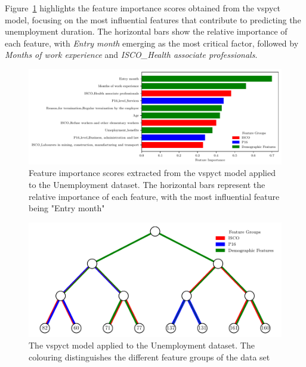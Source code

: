 \documentclass[3p,review,authoryear]{elsarticle}
\begin{document}
Figure~\ref{fig:feature_importance} highlights the feature importance scores obtained from the \gls{vspyct} model, focusing on the most influential features that contribute to predicting the unemployment duration.
The horizontal bars show the relative importance of each feature, with \textit{Entry month} emerging as the most critical factor, followed by \textit{Months of work experience} and \textit{ISCO\_Health associate professionals}.

\begin{figure}[h!]
    \centering
    \includegraphics[width=1.0\textwidth]{feature_importance_colored.pdf}
    \caption{Feature importance scores extracted from the \gls{vspyct} model applied to the Unemployment dataset. The horizontal bars represent the relative importance of each feature, with the most influential feature being "Entry month"}
    \label{fig:feature_importance}
\end{figure}

\begin{figure}[h!]
    \centering
    \includegraphics{hecat_tree_new_temp.pdf}
    \caption{The \gls{vspyct} model applied to the Unemployment dataset. The colouring distinguishes the different feature groups of the data set}
    \label{fig:inter_tree}
\end{figure}


\end{document}

